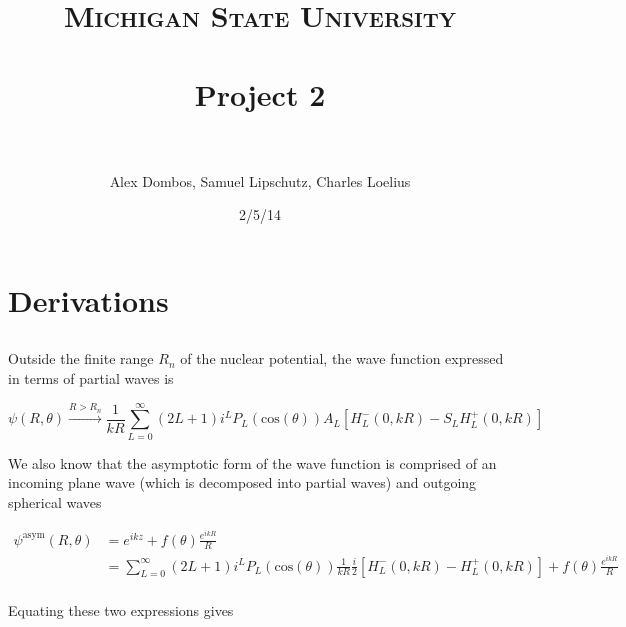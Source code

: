 \documentclass[paper=a4, fontsize=11pt]{scrartcl} %
\title{	
\normalfont \normalsize 
\textsc{Michigan State University} \\ [25pt] %
\horrule{0.5pt} \\[0.4cm] %
\huge  Project 2 \\ %
\horrule{2pt} \\[0.5cm] %
}
\author{Alex Dombos, Samuel Lipschutz, Charles Loelius} %
\date{\normalsize 2/5/14} %
\numberwithin{equation}{section} %
\numberwithin{figure}{section} %
\numberwithin{table}{section} %
\begin{document}
\maketitle %

\section{Derivations}



\subsection{}

Outside the finite range $R_{n}$ of the nuclear potential, the wave function expressed in terms of partial waves is

\begin{equation*}
\psi(R,\theta)\overset{R>R_{n}}{\rightarrow}\frac{1}{kR}\sum_{L=0}^{\infty}\left(2L+1\right)i^{L}P_{L}\left(\textrm{cos}\left(\theta\right)\right)A_{L}\left[H_{L}^{-}\left(0,kR\right)-S_{L}H_{L}^{+}\left(0,kR\right)\right]
\end{equation*}


\noindent We also know that the asymptotic form of the wave function is comprised of an incoming plane wave (which is decomposed into partial waves) and outgoing spherical waves

\begin{align*}
\psi^{\textrm{asym}}(R,\theta)&=e^{ikz}+f(\theta)\frac{e^{ikR}}{R}\\
&=\sum_{L=0}^{\infty}(2L+1)i^{L}P_{L}(\textrm{cos}(\theta))\frac{1}{kR}\frac{i}{2}\left[H_{L}^{-}(0,kR)-H_{L}^{+}(0,kR)\right]+f(\theta)\frac{e^{ikR}}{R}\\
\end{align*}

\noindent Equating these two expressions gives
\end{document}
